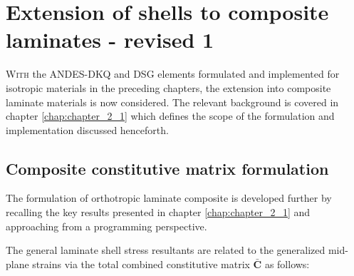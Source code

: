 




\chapter{Extension of shells to composite laminates - revised 1}
\label{chap:chapter_composite_formulation_implementation}

\renewcommand{\Thema}{Extension of shells to composite laminates}

\lettrine[lines=2]{W}{ith} the ANDES-DKQ and DSG elements formulated and implemented for isotropic materials in the preceding chapters, the extension into composite laminate materials is now considered. The relevant background is covered in chapter \ref{chap:chapter_2_1} which defines the scope of the formulation and implementation discussed henceforth.

\section{Composite constitutive matrix formulation}
The formulation of orthotropic laminate composite is developed further by recalling the key results presented in chapter \ref{chap:chapter_2_1} and approaching from a programming perspective.

The general laminate shell stress resultants are related to the generalized mid-plane strains via the total combined constitutive matrix $\bar{\mathbf{C}}$ as follows:

